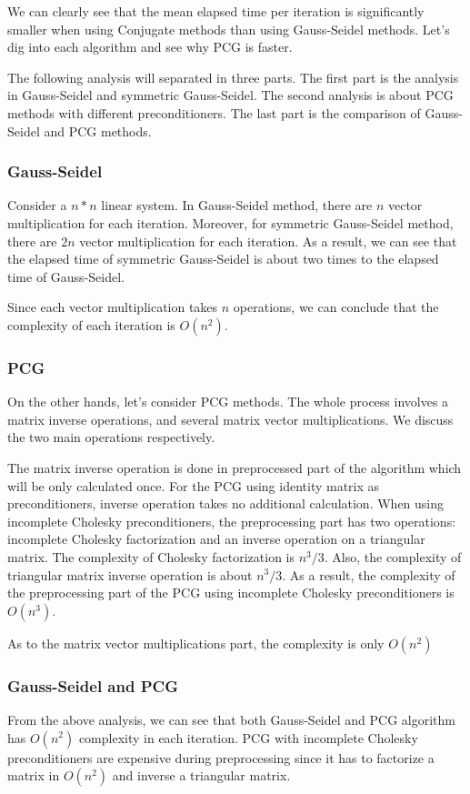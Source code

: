 \documentclass{article}
\begin{document}
We can clearly see that the mean elapsed time per iteration is significantly smaller when using Conjugate methods than using Gauss-Seidel methods. Let's dig into each algorithm and see why PCG is faster.

The following analysis will separated in three parts. The first part is the analysis in Gauss-Seidel and symmetric Gauss-Seidel. The second analysis is about PCG methods with different preconditioners. The last part is the comparison of Gauss-Seidel and PCG methods.

\subsubsection{Gauss-Seidel}
Consider a $n*n$ linear system. In Gauss-Seidel method, there are $n$ vector multiplication for each iteration. Moreover, for symmetric Gauss-Seidel method, there are $2n$ vector multiplication for each iteration. As a result, we can see that the elapsed time of symmetric Gauss-Seidel is about two times to the elapsed time of Gauss-Seidel. 

Since each vector multiplication takes $n$ operations, we can conclude that the complexity of each iteration is $O(n^2)$.
\subsubsection{PCG}
On the other hands, let's consider PCG methods. The whole process involves a matrix inverse operations, and several matrix vector multiplications. We discuss the two main operations respectively. 

The matrix inverse operation is done in preprocessed part of the algorithm which will be only calculated once. For the PCG using identity matrix as preconditioners, inverse operation takes no additional calculation. When using incomplete Cholesky preconditioners, the preprocessing part has two operations: incomplete Cholesky factorization and an inverse operation on a triangular matrix. The complexity of Cholesky factorization is $n^3/3$. Also, the complexity of triangular matrix inverse operation is about $n^3/3$. As a result, the complexity of the preprocessing part of the PCG using incomplete Cholesky preconditioners is $O(n^3)$.

As to the matrix vector multiplications part, the complexity is only $O(n^2)$

\subsubsection{Gauss-Seidel and PCG}
From the above analysis, we can see that both Gauss-Seidel and PCG algorithm has $O(n^2)$ complexity in each iteration. PCG with incomplete Cholesky preconditioners are expensive during preprocessing since it has to factorize a matrix in $O(n^2)$ and inverse a triangular matrix. 
\end{document}
